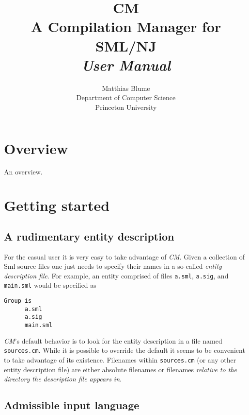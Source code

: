 
\author{Matthias Blume\\
Department of Computer Science\\
Princeton University}

\title{{\bf CM}\\
A Compilation Manager for SML/NJ\\
{\em User Manual}}



\maketitle

\section{Overview}

An overview.

\section{Getting started}

\subsection{A rudimentary entity description}

For the casual user it is very easy to take advantage of {\em CM}.  Given a
collection of {\sc Sml} source files one just needs to specify their names
in a so-called {\em entity description file}.  For example, an entity
comprised of files {\tt a.sml}, {\tt a.sig}, and {\tt main.sml} would be
specified as

\begin{verbatim}
Group is
      a.sml
      a.sig
      main.sml
\end{verbatim}

{\em CM}\/'s default behavior is to look for the entity description in a
file named {\tt sources.cm}.  While it is possible to override the default
it seems to be convenient to take advantage of its existence.  Filenames
within {\tt sources.cm} (or any other entity description file) are either
absolute filenames or filenames {\em relative to the directory the
description file appears in}.

\subsection{Admissible input language}

